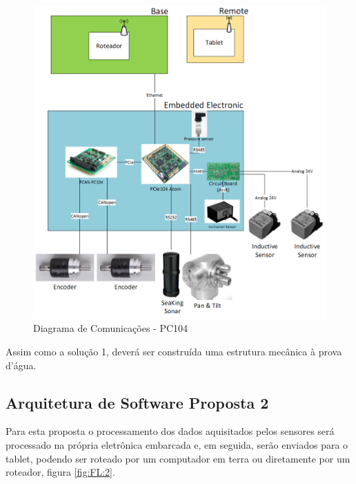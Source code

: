 \begin{figure}[H]
    \centering
    \includegraphics[width=1\columnwidth]{figs/eletronica/4.png}
    \caption{Diagrama de Comunicações - PC104}
    \label{pc104}
\end{figure} 
 
Assim como a solução 1, deverá ser construída uma estrutura mecânica à prova d’água.

\subsection{Arquitetura de Software Proposta 2}

Para esta proposta o processamento dos dados aquisitados pelos sensores será
processado na própria eletrônica embarcada e, em seguida,
 serão enviados para o tablet, podendo ser roteado por um computador em terra ou
 diretamente por um roteador, figura \ref{fig:FL:2}.
 
